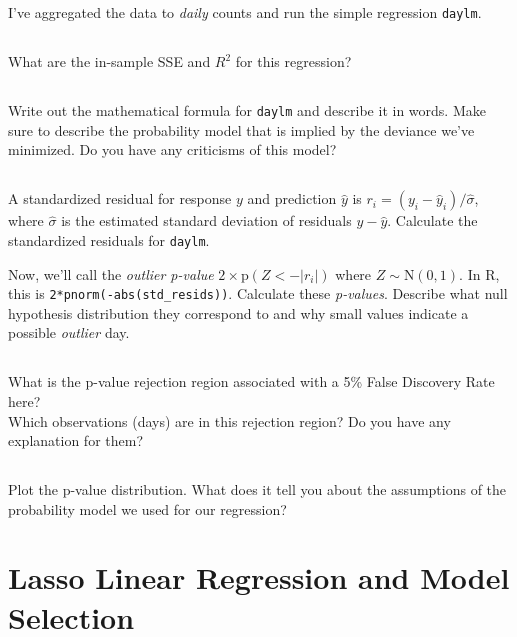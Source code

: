\documentclass[12pt]{article}
\newcommand{\mr}[1]{\mathrm{#1}}
\begin{document}
\bigskip
I've aggregated the data to {\it daily} counts and run the simple regression \texttt{daylm}.

\subsection{}
What are the in-sample SSE and $R^2$ for this regression?

\subsection{}
Write out the mathematical formula for \texttt{daylm} and describe it in words.  Make sure to describe the probability model that is implied by the deviance we've minimized.  Do you have any criticisms of this model?

\subsection{} 
A standardized residual for response $y$ and prediction $\hat y$ is $r_i= (y_i-\hat y_i)/\hat\sigma$, where $\hat\sigma$ is the estimated standard deviation of residuals $y-\hat y$.  Calculate the standardized residuals for \texttt{daylm}.

\medskip \noindent
Now, we'll call the {\it outlier p-value} $2\times \mr{p}(Z < -|r_i|)$ where $Z \sim \mr{N}(0,1)$.  In R, this is \verb!2*pnorm(-abs(std_resids))!. 
Calculate these {\it p-values}.  Describe what null hypothesis distribution they correspond to and why small values indicate a possible {\it outlier} day.

\subsection{} What is the p-value rejection region associated with a 5\% False Discovery Rate here?  \\Which observations (days) are in this rejection region?  Do you have any explanation for them?

\subsection{} Plot the p-value distribution.  What does it tell you about the
assumptions of the probability model we used for our regression?


\newpage
\section{Lasso Linear Regression and Model Selection}
\end{document}
